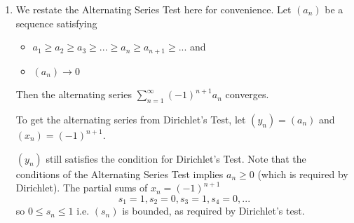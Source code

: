 \documentclass{oxmathproblems}
\begin{document}
\begin{questions}
\begin{solution}
\begin{enumerate}[label=(\alph*)]
    Unlike Abel's Test, we can't argue that $(s_{n})$ converges, because we no longer have the assumption that $\sum_{k=1}^{\infty}x_{k}$ converges. But we still know that $(s_{n})$ is bounded. 
    We also have $(y_{n}) \rightarrow  0$, which implies $(s_{n}y_{n+1}) \rightarrow 0$. The rest is the same as Abel's Test.
  
    \item We restate the Alternating Series Test here for convenience. Let $(a_{n})$ be a sequence satisfying
    \begin{itemize}
      \item $a_{1} \geq a_{2} \geq a_{3} \geq ... \geq a_{n} \geq a_{n+1} \geq ...$ and
      \item $(a_{n}) \rightarrow 0$
    \end{itemize}
    Then the alternating series $\sum_{n=1}^{\infty}(-1)^{n+1}a_{n}$ converges.

    To get the alternating series from Dirichlet's Test, let $(y_{n})=(a_{n})$ and $(x_{n})=(-1)^{n+1}$.

    $(y_{n})$ still satisfies the condition for Dirichlet's Test. Note that the conditions of the Alternating Series Test implies $a_{n} \geq 0$ (which is required by Dirichlet).
    The partial sums of $x_{n}=(-1)^{n+1}$
    \[s_{1}=1, s_{2}=0, s_{3}=1, s_{4}=0, ...\]
    so $0 \leq s_{n} \leq 1$ i.e. $(s_{n})$ is bounded, as required by Dirichlet's test.
  \end{enumerate}
\end{solution}

\end{questions}
\end{document}

